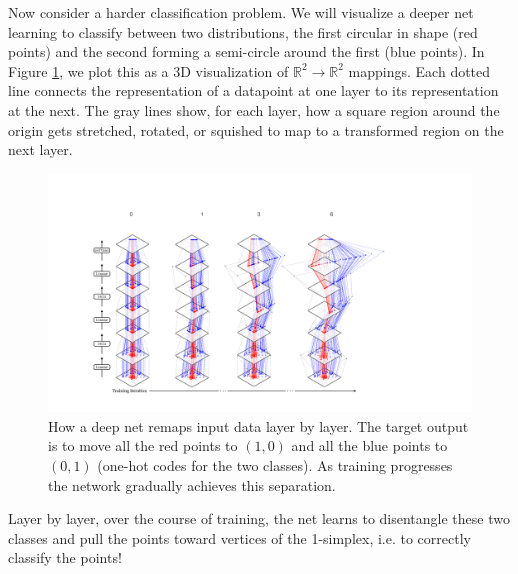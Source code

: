 Now consider a harder classification problem. We will visualize a deeper net learning to classify between two distributions, the first circular in shape (red points) and the second forming a semi-circle around the first (blue points). In Figure \ref{fig:intro_to_learning:neural_nets/nn_training_viz}, we plot this as a 3D visualization of $\mathbb{R}^2 \rightarrow \mathbb{R}^2$ mappings. Each dotted line connects the representation of a datapoint at one layer to its representation at the next. The gray lines show, for each layer, how a square region around the origin gets stretched, rotated, or squished to map to a transformed region on the next layer.
\begin{figure}[h]
    \centerline{
    \includegraphics[width=1.0\linewidth]{./figures/neural_nets/nn_training_viz2.pdf}
    }
    \caption{How a deep net remaps input data layer by layer. The target output is to move all the red points to $(1,0)$ and all the blue points to $(0,1)$ (one-hot codes for the two classes). As training progresses the network gradually achieves this separation.}
    \label{fig:intro_to_learning:neural_nets/nn_training_viz}
\end{figure}

Layer by layer, over the course of training, the net learns to disentangle these two classes and pull the points toward vertices of the 1-simplex, i.e. to correctly classify the points!



